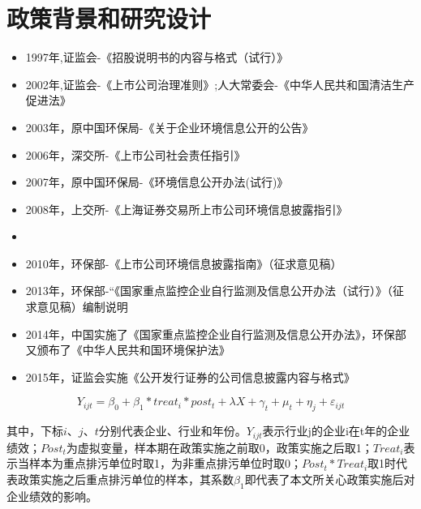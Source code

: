 \documentclass{beamer}	%
\theoremstyle{plain}
\theoremstyle{definition}
\theoremstyle{remark}
\numberwithin{equation}{section}
\begin{document}
\section{政策背景和研究设计}
\begin{frame}
	\small
	\begin{itemize}
		\item 1997年,证监会-《招股说明书的内容与格式（试行）》
		\item 2002年,证监会-《上市公司治理准则》;人大常委会-《中华人民共和国清洁生产促进法》
		\item 2003年，原中国环保局-《关于企业环境信息公开的公告》
		\item 2006年，深交所-《上市公司社会责任指引》
		\item 2007年，原中国环保局-《环境信息公开办法(试行)》
		\item 2008年，上交所-《上海证券交易所上市公司环境信息披露指引》
		\item \textbf{\color{red}{2009年，绿色和平组织-《“沉默的大多数”——企业污染物信息公开状况调查》}}
		\item 2010年，环保部-《上市公司环境信息披露指南》（征求意见稿）
		\item 2013年，环保部-“《国家重点监控企业自行监测及信息公开办法（试行）》（征求意见稿）编制说明
		\item 2014年，中国实施了《国家重点监控企业自行监测及信息公开办法》，环保部又颁布了《中华人民共和国环境保护法》
		\item 2015年，证监会实施《公开发行证券的公司信息披露内容与格式》
	\end{itemize}
\end{frame}

\begin{frame}
	\[Y_{ijt}=\beta_0+\beta_1*treat_i*post_t+\lambda X+\gamma_t+\mu_t+\eta_j+\varepsilon_{ijt}\]

其中，下标$i$、$j$、$t$分别代表企业、行业和年份。$Y_{ijt}$表示行业j的企业i在t年的企业绩效；$Post_t$为虚拟变量，样本期在政策实施之前取0，政策实施之后取1；$Treat_i$表示当样本为重点排污单位时取1，为非重点排污单位时取0；$Post_t*Treat_i$取1时代表政策实施之后重点排污单位的样本，其系数$β_1$即代表了本文所关心政策实施后对企业绩效的影响。
\end{frame}
\end{document}
